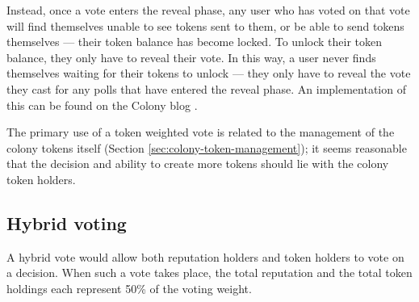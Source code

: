 Instead, once a vote enters the reveal phase, any user who has voted on that vote will find themselves unable to see tokens sent to them, or be able to send tokens themselves --- their token balance has become locked. To unlock their token balance, they only have to reveal their vote. In this way, a user never finds themselves waiting for their tokens to unlock --- they only have to reveal the vote they cast for any polls that have entered the reveal phase. An implementation of this can be found on the Colony blog \cite{ColonyVoting}.

The primary use of a token weighted vote is related to the management of the colony tokens itself (Section \ref{sec:colony-token-management}); it seems reasonable that the decision and ability to create more tokens should lie with the colony token holders.

\subsection{Hybrid voting}
A hybrid vote would allow both reputation holders and token holders to vote on a decision. When such a vote takes place, the total reputation and the total token holdings each represent 50\% of the voting weight.
